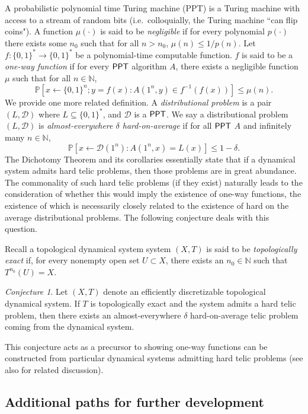 \documentclass{amsart}
\theoremstyle{theorem}
\theoremstyle{remark}
\newtheorem{conjecture}[theorem]{Conjecture}
\numberwithin{equation}{section}
\newcommand{\NN}{\mathbb{N}}
\newcommand{\PP}{\mathbb{P}}
\newcommand{\ccPPT}{\textsf{\upshape PPT}}
\newcommand{\cD}{\mathcal{D}}
\begin{document}
A probabilistic polynomial time Turing machine (\ccPPT) is a Turing machine with access to a stream of random bits (i.e.\, colloquially, the Turing machine ``can flip coins"). A function $\mu(\cdot)$ is said to be \emph{negligible} if for every polynomial $p(\cdot)$ there exists some $n_0$ such that for all $n > n_0$, $\mu(n) \leq 1/p(n)$.
Let $f:\{0,1\}^*\rightarrow \{0,1\}^*$ be a polynomial-time computable function. $f$ is said to be a \emph{one-way function} if for every $\ccPPT$ algorithm $A$, there exists a negligible function $\mu$ such that for all $n \in \NN$,
\[
\PP[x \leftarrow \{0,1\}^n;y = f(x): A(1^n, y) \in f^{-1}(f(x))] \leq \mu(n).
\]
We provide one more related definition. A \emph{distributional problem} is a pair $(L, \cD)$ where $L \subseteq\{0,1\}^*$, and $\cD$ is a $\ccPPT$.
We say a distributional problem $(L, \cD)$ is \emph{almost-everywhere $\delta$ hard-on-average} if for all $\ccPPT$ $A$ and infinitely many $n \in \NN$,
\[
\PP[x \leftarrow \cD(1^n):  A(1^n, x) = L(x)] \leq 1-\delta.
\]
The Dichotomy Theorem and its corollaries essentially state that if a dynamical system admits hard telic problems, then those problems are in great abundance.
The commonality of such hard telic problems (if they exist) naturally leads to the consideration of whether this would imply the existence of one-way functions, the existence of which is necessarily closely related to the existence of hard on the average distributional problems. The following conjecture deals with this question.

Recall a topological dynamical system system $(X, T)$ is said to be \emph{topologically exact} if, for every nonempty open set $U \subset X$, there exists an $n_0 \in \mathbb{N}$ such that $T^{n_0}(U) = X$.

\begin{conjecture}\label{conjectureCrypto}
Let $(X, T)$ denote an efficiently discretizable topological dynamical system.
If $T$ is topologically exact and the system admits a hard telic problem, then there exists an almost-everywhere $\delta$ hard-on-average telic problem coming from the dynamical system.
\end{conjecture}

This conjecture acts as a precursor to showing one-way functions can be constructed from particular dynamical systems admitting hard telic problems (see also \cite{everett2024use} for related discussion).



\subsection{Additional paths for further development}
\end{document}
